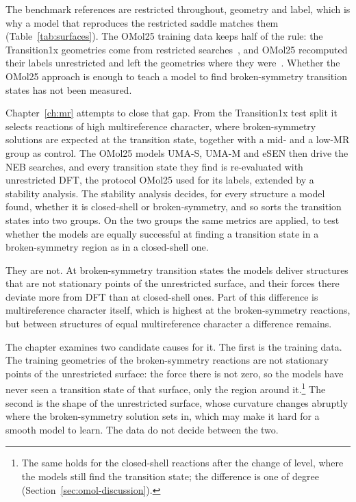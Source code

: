 The benchmark references are restricted throughout, geometry and label,
which is why a model that reproduces the restricted saddle matches them
(Table~\ref{tab:surfaces}).
The OMol25 training data keeps half of the rule: the Transition1x
geometries come from restricted searches~\cite{schreiner2022}, and
OMol25 recomputed their labels unrestricted and left the geometries
where they were~\cite{omol25}.
Whether the OMol25 approach is enough to teach a model to find
broken-symmetry transition states has not been measured.

Chapter~\ref{ch:mr} attempts to close that gap. From the Transition1x
test split it selects reactions of high multireference character,
where broken-symmetry solutions are expected at the transition state,
together with a mid- and a low-MR group as control. The OMol25 models
UMA-S, UMA-M and eSEN then drive the NEB searches, and every transition
state they find is re-evaluated with unrestricted DFT, the protocol
OMol25 used for its labels, extended by a stability analysis. The
stability analysis decides, for every structure a model found, whether
it is closed-shell or broken-symmetry, and so sorts the transition
states into two groups. On the two groups the same
metrics are applied, to test whether the models are equally successful
at finding a transition state in a broken-symmetry region as in a
closed-shell one.

They are not. At broken-symmetry transition states the models deliver
structures that are not stationary points of the unrestricted surface,
and their forces there deviate more from DFT than at closed-shell ones.
Part of this difference is multireference character itself, which is
highest at the broken-symmetry reactions, but between structures of
equal multireference character a difference remains.

The chapter examines two candidate causes for it. The first is the
training data.
The training geometries of the broken-symmetry reactions are not
stationary points of the unrestricted surface: the force there is
not zero, so the models have never seen a transition state of that
surface, only the region around it.\footnote{The same holds for the
closed-shell reactions after the change of level, where the models
still find the transition state; the difference is one of degree
(Section~\ref{sec:omol-discussion}).}
The second is the shape of the unrestricted surface, whose curvature
changes abruptly where the broken-symmetry solution sets in, which may
make it hard for a smooth model to learn. The data do not decide
between the two.

